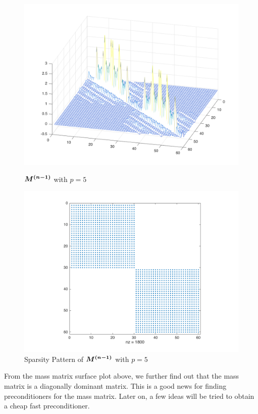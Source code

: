 \begin{figure}[H]
	\includegraphics[width=\linewidth]{full_mass_quad_2p}
	\caption{$\boldsymbol{M^{(n-1)}}$ with $p=5$}
	\label{mass_surf}
	\endminipage \hfill
	\includegraphics[width=\linewidth]{mass_spy_2p}
	\caption{Sparsity Pattern of $\boldsymbol{M^{(n-1)}}$ with $p=5$}
	\label{mass_spy}
	\endminipage
\end{figure} 
 From the mass matrix surface plot above, we further find out that the mass matrix is a diagonally dominant matrix. This is a good news for finding preconditioners for the mass matrix. Later on, a few ideas will be tried to obtain a cheap fast preconditioner.   \\
 
